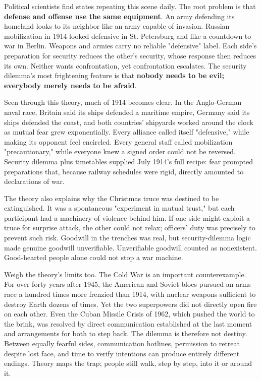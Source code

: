 Political scientists find states repeating this scene daily. The root problem is that \textbf{defense and offense use the same equipment}. An army defending its homeland looks to its neighbor like an army capable of invasion. Russian mobilization in 1914 looked defensive in St. Petersburg and like a countdown to war in Berlin. Weapons and armies carry no reliable "defensive" label. Each side's preparation for security reduces the other's security, whose response then reduces its own. Neither wants confrontation, yet confrontation escalates. The security dilemma's most frightening feature is that \textbf{nobody needs to be evil; everybody merely needs to be afraid}.

Seen through this theory, much of 1914 becomes clear. In the Anglo-German naval race, Britain said its ships defended a maritime empire, Germany said its ships defended the coast, and both countries' shipyards worked around the clock as mutual fear grew exponentially. Every alliance called itself "defensive," while making its opponent feel encircled. Every general staff called mobilization "precautionary," while everyone knew a signed order could not be reversed. Security dilemma plus timetables supplied July 1914's full recipe: fear prompted preparations that, because railway schedules were rigid, directly amounted to declarations of war.

The theory also explains why the Christmas truce was destined to be extinguished. It was a spontaneous "experiment in mutual trust," but each participant had a machinery of violence behind him. If one side might exploit a truce for surprise attack, the other could not relax; officers' duty was precisely to prevent such risk. Goodwill in the trenches was real, but security-dilemma logic made genuine goodwill unverifiable. Unverifiable goodwill counted as nonexistent. Good-hearted people alone could not stop a war machine.

Weigh the theory's limits too. The Cold War is an important counterexample. For over forty years after 1945, the American and Soviet blocs pursued an arms race a hundred times more frenzied than 1914, with nuclear weapons sufficient to destroy Earth dozens of times. Yet the two superpowers did not directly open fire on each other. Even the Cuban Missile Crisis of 1962, which pushed the world to the brink, was resolved by direct communication established at the last moment and arrangements for both to step back. The dilemma is therefore not destiny. Between equally fearful sides, communication hotlines, permission to retreat despite lost face, and time to verify intentions can produce entirely different endings. Theory maps the trap; people still walk, step by step, into it or around it.

